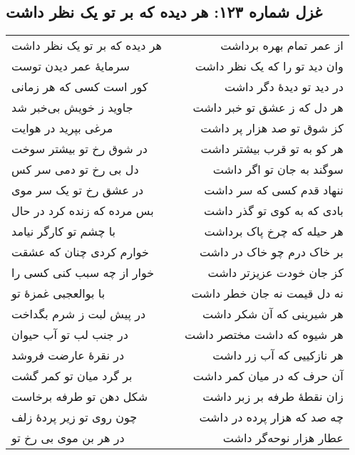 \begin{center}
\section*{غزل شماره ۱۲۳: هر دیده که بر تو یک نظر داشت}
\label{sec:123}
\begin{longtable}{l p{0.5cm} r}
هر دیده که بر تو یک نظر داشت
&&
از عمر تمام بهره برداشت
\\
سرمایهٔ عمر دیدن توست
&&
وان دید تو را که یک نظر داشت
\\
کور است کسی که هر زمانی
&&
در دید تو دیدهٔ دگر داشت
\\
جاوید ز خویش بی‌خبر شد
&&
هر دل که ز عشق تو خبر داشت
\\
مرغی بپرید در هوایت
&&
کز شوق تو صد هزار پر داشت
\\
در شوق رخ تو بیشتر سوخت
&&
هر کو به تو قرب بیشتر داشت
\\
دل بی رخ تو دمی سر کس
&&
سوگند به جان تو اگر داشت
\\
در عشق رخ تو یک سر موی
&&
ننهاد قدم کسی که سر داشت
\\
بس مرده که زنده کرد در حال
&&
بادی که به کوی تو گذر داشت
\\
با چشم تو کارگر نیامد
&&
هر حیله که چرخ پاک برداشت
\\
خوارم کردی چنان که عشقت
&&
بر خاک درم چو خاک در داشت
\\
خوار از چه سبب کنی کسی را
&&
کز جان خودت عزیزتر داشت
\\
با بوالعجبی غمزهٔ تو
&&
نه دل قیمت نه جان خطر داشت
\\
در پیش لبت ز شرم بگداخت
&&
هر شیرینی که آن شکر داشت
\\
در جنب لب تو آب حیوان
&&
هر شیوه که داشت مختصر داشت
\\
در نقرهٔ عارضت فروشد
&&
هر نازکییی که آب زر داشت
\\
بر گرد میان تو کمر گشت
&&
آن حرف که در میان کمر داشت
\\
شکل دهن تو طرفه برخاست
&&
زان نقطهٔ طرفه بر زبر داشت
\\
چون روی تو زیر پردهٔ زلف
&&
چه صد که هزار پرده در داشت
\\
در هر بن موی بی رخ تو
&&
عطار هزار نوحه‌گر داشت
\\
\end{longtable}
\end{center}
